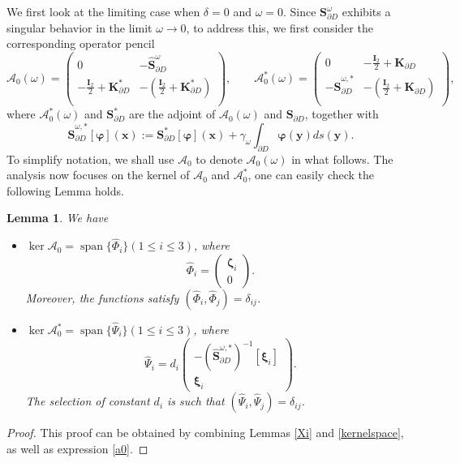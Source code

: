 \documentclass[10pt,reqno,oneside]{amsart}%
\newtheorem{lem}{Lemma}[section]
\theoremstyle{definition}
\theoremstyle{remark}
\numberwithin{equation}{section}
\numberwithin{equation}{section}
\begin{document}
{We first look at the limiting case when $\delta=0$ and $\omega=0$. Since $\mathbf{S}_{\partial D}^{\omega}$ exhibits a singular behavior in the limit $\omega \to 0$, to address this, we first consider the corresponding operator pencil%
\begin{equation}\label{a0}
\mathcal{A}_0(\omega)=
\begin{pmatrix}
0 & -\hat{\mathbf{S}}_{\partial D}^{\omega}\\
-\frac{\mathbf{I}_2}{2}+\mathbf{K}_{\partial D}^* &
-(\frac{\mathbf{I}_2}{2}+\mathbf{K}_{\partial D}^*)\\
\end{pmatrix},\quad\quad
\mathcal{A}_0^*(\omega)=
\begin{pmatrix}
0 & -\frac{\mathbf{I}_2}{2}+\mathbf{K}_{\partial D}\\
-\hat{\mathbf{S}}_{\partial D}^{{\omega},* }&
-(\frac{\mathbf{I}_2}{2}+\mathbf{K}_{\partial D})\\
\end{pmatrix},
\end{equation}
where $\mathcal{A}_0^*(\omega)$ and $\mathbf{S}_{\partial D}^*$ are the adjoint of $\mathcal{A}_0(\omega)$ and $\mathbf{S}_{\partial D}$,  together with
$$
\hat{\mathbf{S}}_{\partial D}^{{\omega},* }[\boldsymbol{\varphi}](\mathbf{x}):=\mathbf{S}_{\partial D}^{*}[\boldsymbol{\varphi}](\mathbf{x})+\gamma_{\omega}\int_{\partial D}\boldsymbol{\varphi}(\mathbf{y})d s(\mathbf{y}).
$$
To simplify notation, we shall use $\mathcal{A}_0$ to denote $\mathcal{A}_0({\omega})$ in what follows. The analysis now focuses on the kernel of $\mathcal{A}_0$ and $\mathcal{A}^*_0$, one can easily check the following Lemma holds.}
\begin{lem}\label{ker space2}
We have
\begin{itemize}
\item[(i)] $\operatorname{ker} \mathcal{A}_0=\operatorname{span}\{\hat{\Phi}_{i}\}(1\leq i\leq 3)$, where
$$
\hat{\Phi}_{i}=
\begin{pmatrix}
\boldsymbol{\zeta}_i\\
0
\end{pmatrix}.
$$
Moreover, the functions satisfy $(\hat{\Phi}_{i},\hat{\Phi}_{j})={\delta_{ij}}$.
\item[(ii)] $\operatorname{ker} \mathcal{A}^*_0=\operatorname{span}\{\hat{\Psi}_{i}\}(1\leq i\leq 3)$, where
$$
\hat{\Psi}_{i}=d_{i}
\begin{pmatrix}
{-(\hat{\mathbf{S}}_{\partial D}^{{\omega},* })^{-1}[\boldsymbol{\xi}_i]}\\
\boldsymbol{\xi}_i
\end{pmatrix}.
$$
The selection of constant $d_{i}$ is such that $(\hat{\Psi}_{i},\hat{\Psi}_{j})={\delta_{ij}}$.
\end{itemize}
\end{lem}
\begin{proof}
This proof can be obtained by combining Lemmas \ref{Xi} and \ref{kernelspace}, as well as expression \eqref{a0}.
\end{proof}
\end{document}
